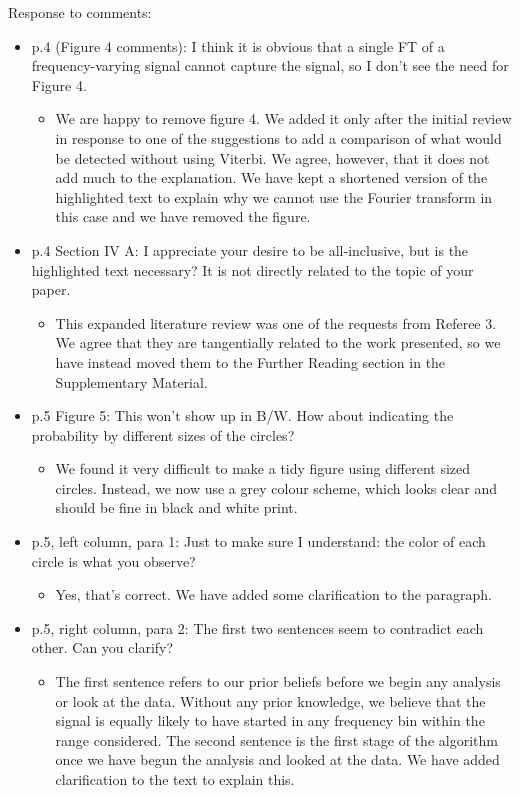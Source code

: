\documentclass[a4paper, 10pt]{letter}
\begin{document}
Response to comments:
\begin{itemize}
\item p.4 (Figure 4 comments):  I think it is obvious that a single FT of a frequency-varying signal cannot capture the signal, so I don't see the need for Figure 4. 
\begin{itemize}
\item We are happy to remove figure 4. We added it only after the initial review in response to one of the suggestions to add a comparison of what would be detected without using Viterbi. We agree, however, that it does not add much to the explanation. We have kept a shortened version of the highlighted text to explain why we cannot use the Fourier transform in this case and we have removed the figure. 
\end{itemize}

\item p.4 Section IV A: I appreciate your desire to be all-inclusive, but is the highlighted text necessary? It is not directly related to the topic of your paper. 
\begin{itemize}
\item This expanded literature review was one of the requests from Referee 3. We agree that they are tangentially related to the work presented, so we have instead moved them to the Further Reading section in the Supplementary Material. 
\end{itemize}

\item p.5 Figure 5: This won't show up in B/W. How about indicating the probability by different sizes of the circles? 
\begin{itemize}
\item We found it very difficult to make a tidy figure using different sized circles. Instead, we now use a grey colour scheme, which looks clear and should be fine in black and white print. 
\end{itemize}

\item p.5, left column, para 1: Just to make sure I understand: the color of each circle is what you observe?
\begin{itemize}
\item Yes, that's correct. We have added some clarification to the paragraph.
\end{itemize}

\item p.5, right column, para 2: The first two sentences seem to contradict each other. Can you clarify? 
\begin{itemize}
\item The first sentence refers to our prior beliefs before we begin any analysis or look at the data. Without any prior knowledge, we believe that the signal is equally likely to have started in any frequency bin within the range considered. The second sentence is the first stage of the algorithm once we have begun the analysis and looked at the data. We have added clarification to the text to explain this. 
\end{itemize}


\end{itemize}
\end{document}
